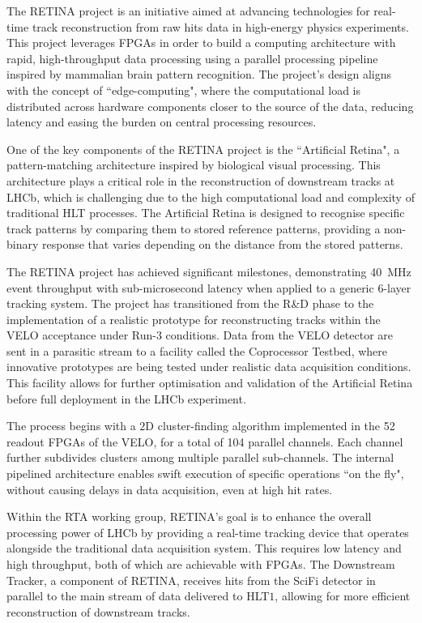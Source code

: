 The RETINA project\cite{Lazzari:2801062} is an initiative aimed at advancing technologies for real-time track reconstruction from raw hits data in high-energy physics experiments. This project leverages FPGAs in order to build a computing architecture with rapid, high-throughput data processing using a parallel processing pipeline inspired by mammalian brain pattern recognition. The project's design aligns with the concept of ``edge-computing", where the computational load is distributed across hardware components closer to the source of the data, reducing latency and easing the burden on central processing resources.


One of the key components of the RETINA project is the ``Artificial Retina"\cite{Ristori:2000vg}, a pattern-matching architecture inspired by biological visual processing. This architecture plays a critical role in the reconstruction of downstream tracks at LHCb, which is challenging due to the high computational load and complexity of traditional HLT processes. The Artificial Retina is designed to recognise specific track patterns by comparing them to stored reference patterns, providing a non-binary response that varies depending on the distance from the stored patterns.

The RETINA project has achieved significant milestones, demonstrating \SI{40}{\mega\hertz} event throughput with sub-microsecond latency when applied to a generic 6-layer tracking system. The project has transitioned from the R\&D phase to the implementation of a realistic prototype for reconstructing tracks within the VELO acceptance under Run-3 conditions. Data from the VELO detector are sent in a parasitic stream to a facility called the Coprocessor Testbed, where innovative prototypes are being tested under realistic data acquisition conditions. This facility allows for further optimisation and validation of the Artificial Retina before full deployment in the LHCb experiment.

The process begins with a $2$D cluster-finding algorithm implemented in the 52 readout FPGAs of the VELO, for a total of 104 parallel channels. Each channel further subdivides clusters among multiple parallel sub-channels. The internal pipelined architecture enables swift execution of specific operations ``on the fly", without causing delays in data acquisition, even at high hit rates.

Within the RTA working group, RETINA’s goal is to enhance the overall processing power of LHCb by providing a real-time tracking device that operates alongside the traditional data acquisition system. This requires low latency and high throughput, both of which are achievable with FPGAs. The Downstream Tracker, a component of RETINA, receives hits from the SciFi detector in parallel to the main stream of data delivered to HLT$1$, allowing for more efficient reconstruction of downstream tracks.

